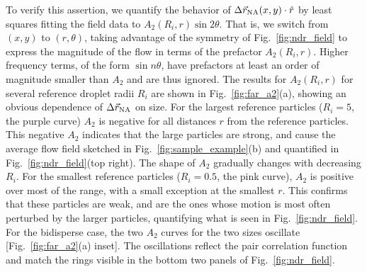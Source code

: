\documentclass[%
 reprint,
 amsmath,amssymb,
 aps,
]{revtex4-2}
\begin{document}
To verify this assertion, we quantify the behavior of $\Delta \vec{r}_{\rm NA}(x,y) \cdot \hat{r}$ by least squares fitting the field data to $A_2(R_i,r)\sin{2\theta}$. That is, we switch from $(x,y)$ to $(r,\theta)$, taking advantage of the symmetry of Fig.~\ref{fig:ndr_field} to express the magnitude of the flow in terms of the prefactor $A_2(R_i,r)$. Higher frequency terms, of the form  $\sin{n\theta}$, have prefactors at least an order of magnitude smaller than $A_2$ and are thus ignored. The results for $A_2(R_i,r)$ for several reference droplet radii $R_i$ are shown in Fig.~\ref{fig:far_a2}(a), showing an obvious dependence of $\Delta \vec{r}_{\rm NA}$ on size. For the largest reference particles (${R}_i=5$, the purple curve) $A_2$ is negative for all distances $r$ from the reference particles.  This negative $A_2$ indicates that the large particles are strong, and cause the average flow field sketched in Fig.~\ref{fig:sample_example}(b) and quantified in Fig.~\ref{fig:ndr_field}(top right).  The shape of $A_2$ gradually changes with decreasing ${R}_i$. For the smallest reference particles ($R_i=0.5$, the  pink curve), $A_2$ is positive over most of the range, with a small exception at the smallest $r$.  This confirms that these particles are weak, and are the ones whose motion is most often perturbed by the larger particles, quantifying what is seen in Fig.~\ref{fig:ndr_field}.  For the bidisperse case, the two $A_2$ curves for the two sizes oscillate [Fig.~\ref{fig:far_a2}(a) inset].  The oscillations reflect the pair correlation function and match the rings visible in the bottom two panels of Fig.~\ref{fig:ndr_field}.
\end{document}
